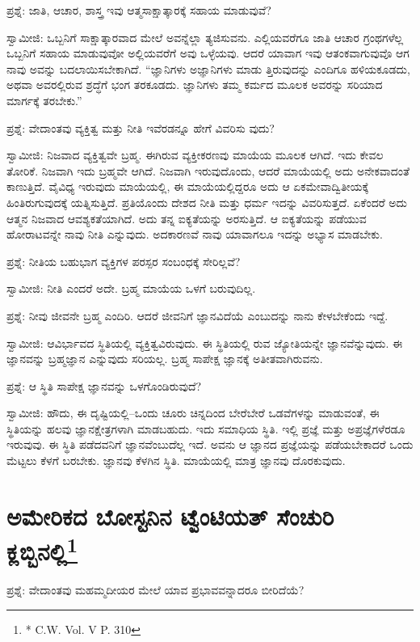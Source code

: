 ಪ್ರಶ್ನೆ: ಜಾತಿ, ಆಚಾರ, ಶಾಸ್ತ್ರ ಇವು ಆತ್ಮಸಾಕ್ಷಾತ್ಕಾರಕ್ಕೆ ಸಹಾಯ ಮಾಡುವುವೆ?

ಸ್ವಾಮೀಜಿ: ಒಬ್ಬನಿಗೆ ಸಾಕ್ಷಾತ್ಕಾರವಾದ ಮೇಲೆ ಅವನ್ನೆಲ್ಲಾ ತ್ಯಜಿಸುವನು. ಎಲ್ಲಿಯವರೆಗೂ ಜಾತಿ ಆಚಾರ ಗ್ರಂಥಗಳೆಲ್ಲ ಒಬ್ಬನಿಗೆ ಸಹಾಯ ಮಾಡುವುವೋ ಅಲ್ಲಿಯವರೆಗೆ ಅವು ಒಳ್ಳೆಯವು. ಆದರೆ ಯಾವಾಗ ಇವು ಆತಂಕವಾಗುವುವೊ ಆಗ ನಾವು ಅವನ್ನು ಬದಲಾಯಿಸಬೇಕಾಗಿದೆ. “ಜ್ಞಾನಿಗಳು ಅಜ್ಞಾನಿಗಳು ಮಾಡು ತ್ತಿರುವುದನ್ನು ಎಂದಿಗೂ ಹಳಿಯಕೂಡದು, ಅಥವಾ ಅವರಲ್ಲಿರುವ ಶ್ರದ್ಧೆಗೆ ಭಂಗ ತರಕೂಡದು. ಜ್ಞಾನಿಗಳು ತಮ್ಮ ಕರ್ಮದ ಮೂಲಕ ಅವರನ್ನು ಸರಿಯಾದ ಮಾರ್ಗಕ್ಕೆ ತರಬೇಕು.”

ಪ್ರಶ್ನೆ: ವೇದಾಂತವು ವ್ಯಕ್ತಿತ್ವ ಮತ್ತು ನೀತಿ ಇವೆರಡನ್ನೂ ಹೇಗೆ ವಿವರಿಸು ವುದು?

ಸ್ವಾಮೀಜಿ: ನಿಜವಾದ ವ್ಯಕ್ತಿತ್ವವೇ ಬ್ರಹ್ಮ. ಈಗಿರುವ ವ್ಯಕ್ತೀಕರಣವು ಮಾಯೆಯ ಮೂಲಕ ಆಗಿದೆ. ಇದು ಕೇವಲ ತೋರಿಕೆ. ನಿಜವಾಗಿ ಇದು ಬ್ರಹ್ಮವೇ ಆಗಿದೆ. ನಿಜವಾಗಿ ಇರುವುದೊಂದು, ಆದರೆ ಮಾಯೆಯಲ್ಲಿ ಅದು ಅನೇಕವಾದಂತೆ ಕಾಣುತ್ತಿದೆ. ವೈವಿಧ್ಯ ಇರುವುದು ಮಾಯೆಯಲ್ಲಿ, ಈ ಮಾಯೆಯಲ್ಲಿದ್ದರೂ ಅದು ಆ ಏಕಮೇವಾದ್ವಿತೀಯಕ್ಕೆ ಹಿಂತಿರುಗುವುದಕ್ಕೆ ಯತ್ನಿಸುತ್ತಿದೆ. ಪ್ರತಿಯೊಂದು ದೇಶದ ನೀತಿ ಮತ್ತು ಧರ್ಮ ಇದನ್ನು ವಿವರಿಸುತ್ತದೆ. ಏಕೆಂದರೆ ಅದು ಆತ್ಮನ ನಿಜವಾದ ಆವಶ್ಯಕತೆಯಾಗಿದೆ. ಅದು ತನ್ನ ಐಕ್ಯತೆಯನ್ನು ಅರಸುತ್ತಿದೆ. ಆ ಐಕ್ಯತೆಯನ್ನು ಪಡೆಯುವ ಹೋರಾಟವನ್ನೇ ನಾವು ನೀತಿ ಎನ್ನುವುದು. ಅದಕಾರಣವೆ ನಾವು ಯಾವಾಗಲೂ ಇದನ್ನು ಅಭ್ಯಾಸ ಮಾಡಬೇಕು.

ಪ್ರಶ್ನೆ: ನೀತಿಯ ಬಹುಭಾಗ ವ್ಯಕ್ತಿಗಳ ಪರಸ್ಪರ ಸಂಬಂಧಕ್ಕೆ ಸೇರಿಲ್ಲವೆ?

ಸ್ವಾಮೀಜಿ: ನೀತಿ ಎಂದರೆ ಅದೇ. ಬ್ರಹ್ಮ ಮಾಯೆಯ ಒಳಗೆ ಬರುವುದಿಲ್ಲ.

ಪ್ರಶ್ನೆ: ನೀವು ಜೀವನೇ ಬ್ರಹ್ಮ ಎಂದಿರಿ. ಆದರೆ ಜೀವನಿಗೆ ಜ್ಞಾನವಿದೆಯೆ ಎಂಬುದನ್ನು ನಾನು ಕೇಳಬೇಕೆಂದು ಇದ್ದೆ.

ಸ್ವಾಮೀಜಿ: ಆವಿರ್ಭಾವದ ಸ್ಥಿತಿಯಲ್ಲಿ ವ್ಯಕ್ತಿತ್ವವಿರುವುದು. ಈ ಸ್ಥಿತಿಯಲ್ಲಿ ರುವ ಜ್ಯೋತಿಯನ್ನೇ ಜ್ಞಾನವೆನ್ನುವುದು. ಈ ಜ್ಞಾನವನ್ನು ಬ್ರಹ್ಮಜ್ಞಾನ ಎನ್ನುವುದು ಸರಿಯಲ್ಲ. ಬ್ರಹ್ಮ ಸಾಪೇಕ್ಷ ಜ್ಞಾನಕ್ಕೆ ಅತೀತವಾಗಿರುವನು.

ಪ್ರಶ್ನೆ: ಆ ಸ್ಥಿತಿ ಸಾಪೇಕ್ಷ ಜ್ಞಾನವನ್ನು ಒಳಗೊಂಡಿರುವುದೆ?

ಸ್ವಾಮೀಜಿ: ಹೌದು, ಈ ದೃಷ್ಟಿಯಲ್ಲಿ–ಒಂದು ಚೂರು ಚಿನ್ನದಿಂದ ಬೇರೆಬೇರೆ ಒಡವೆಗಳನ್ನು ಮಾಡುವಂತೆ, ಈ ಸ್ಥಿತಿಯನ್ನು ಹಲವು ಜ್ಞಾನಕ್ಷೇತ್ರಗಳಾಗಿ ಮಾಡಬಹುದು. ಇದು ಸಮಾಧಿಯ ಸ್ಥಿತಿ. ಇಲ್ಲಿ ಪ್ರಜ್ಞೆ ಮತ್ತು ಅಪ್ರಜ್ಞೆಗಳೆರಡೂ ಇರುವುವು. ಈ ಸ್ಥಿತಿ ಪಡೆದವನಿಗೆ ಜ್ಞಾನವೆಂಬುದೆಲ್ಲ ಇದೆ. ಅವನು ಆ ಜ್ಞಾನದ ಪ್ರಜ್ಞೆಯನ್ನು ಪಡೆಯಬೇಕಾದರೆ ಒಂದು ಮೆಟ್ಟಲು ಕೆಳಗೆ ಬರಬೇಕು. ಜ್ಞಾನವು ಕೆಳಗಿನ ಸ್ಥಿತಿ. ಮಾಯೆಯಲ್ಲಿ ಮಾತ್ರ ಜ್ಞಾನವು ದೊರಕುವುದು.


\section{ಅಮೇರಿಕದ ಬೋಸ್ಟನಿನ ಟ್ವೆಂಟಿಯತ್ ಸೆಂಚುರಿ ಕ್ಲಬ್ಬಿನಲ್ಲಿ\protect\footnote{* C.W. Vol. V P. 310}}

ಪ್ರಶ್ನೆ: ವೇದಾಂತವು ಮಹಮ್ಮದೀಯರ ಮೇಲೆ ಯಾವ ಪ್ರಭಾವವನ್ನಾದರೂ ಬೀರಿದೆಯೆ?

